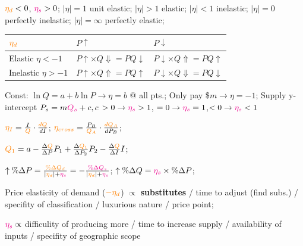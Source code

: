 \documentclass[a4paper]{article}
\begin{document}
\begin{multicols*}{3}
    $\textcolor{orange}{\eta_d} < 0$, $\textcolor{magenta}{\eta_s} > 0$; $|\eta|=1$ unit elastic; $|\eta|>1$ elastic; $|\eta|<1$ inelastic; $|\eta|=0$ perfectly inelastic; $|\eta|=\infty$ perfectly elastic;

        \begin{tabular}{|l|l|l|}
            \hline
            $\textcolor{orange}{\eta_d}$ & $P\uparrow$                                   & $P\downarrow$                                   \\
            \hline
            Elastic $\eta<-1$            & $P\uparrow \times Q\Downarrow = PQ\downarrow$ & $P\downarrow \times Q\Uparrow = PQ\uparrow$     \\
            Inelastic $\eta>-1$          & $P\uparrow \times Q\Uparrow = PQ\uparrow$     & $P\downarrow \times Q\Downarrow = PQ\downarrow$ \\
            \hline
        \end{tabular}

        Const: $\ln Q = a + b\ln P \to \eta=b$ @ all pts.; Only pay \$$m \to \eta = -1$; Supply y-intercept $P_s=m\textcolor{magenta}{Q_s}+c, c$ $>0\to\textcolor{magenta}{\eta_s}>1$, $=0\to\textcolor{magenta}{\eta_s}=1$,$<0\to\textcolor{magenta}{\eta_s}<1$

    $\textcolor{orange}{\eta_I} = \frac{I}{\textcolor{orange}{Q}}\cdot\frac{\textcolor{orange}{dQ}}{dI}$; $\textcolor{orange}{\eta_{cross}} = \frac{P_B}{\textcolor{orange}{Q_A}}\cdot\frac{\textcolor{orange}{dQ_A}}{dP_B}$;

    $\textcolor{orange}{Q_1}=a-\frac{\Delta \textcolor{orange}{Q}}{\Delta P}P_1+\frac{\Delta \textcolor{orange}{Q_1}}{\Delta P_2}P_2-\frac{\Delta \textcolor{orange}{Q}}{\Delta I}I$;

    $\uparrow\%\Delta P = \frac{\textcolor{orange}{\%\Delta Q_d}}{|\textcolor{orange}{\eta_d}|+\textcolor{magenta}{\eta_s}}= -\frac{\textcolor{magenta}{\%\Delta Q_s}}{|\textcolor{orange}{\eta_d}|+\textcolor{magenta}{\eta_s}}$; $\uparrow\%\Delta Q = \textcolor{magenta}{\eta_s}\times\%\Delta P$;



        Price elasticity of demand ($\textcolor{orange}{-\eta_d}$) $\propto$ \textbf{substitutes} / time to adjust (find subs.) / specifity of classification / luxurious nature / price point;

    $\textcolor{magenta}{\eta_s}\propto$ difficulity of producing more / time to increase supply / availability of inputs / specifity of geographic scope


\end{multicols*}
\end{document}
